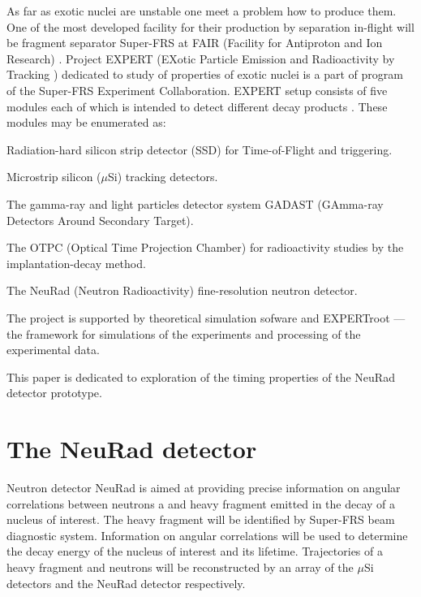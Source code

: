 \documentclass{webofc}
\begin{document}
As far as exotic nuclei are unstable one meet a problem how to produce them.
One of the most developed facility for their production by separation in-flight will be fragment separator Super-FRS at FAIR (Facility for Antiproton and Ion Research) \cite{diplom}. Project EXPERT (EXotic Particle Emission and Radioactivity by Tracking \cite{IMexpert}) dedicated to study of properties of exotic nuclei is a part of program of the Super-FRS Experiment Collaboration. EXPERT setup consists of five modules each of which is intended to detect different decay products \cite{tdr}.
These modules may be enumerated as:
\begin{inparaenum}[(i)]
	\item Radiation-hard silicon strip detector (SSD) for Time-of-Flight and triggering.
	\item Microstrip silicon ($\mu$Si) tracking detectors.
	\item The gamma-ray and light particles detector system GADAST (GAmma-ray Detectors Around Secondary Target).
	\item The OTPC (Optical Time Projection Chamber) for radioactivity studies by the implantation-decay method.
	\item The NeuRad (Neutron Radioactivity) fine-resolution neutron detector.
\end{inparaenum}

The project is supported by theoretical simulation sofware and EXPERTroot \cite{er} --- the framework for simulations of the experiments and processing of the experimental data. 

This paper is dedicated to exploration of the timing properties of the NeuRad detector prototype.

\section{The NeuRad detector}

Neutron detector NeuRad is aimed at providing precise information on angular correlations between neutrons a and heavy fragment emitted in the decay of a nucleus of interest. The heavy fragment will be identified by Super-FRS beam diagnostic system. Information on angular correlations will be used to determine the decay energy of the nucleus of interest and its lifetime. Trajectories of a heavy fragment and neutrons will be reconstructed by an array of the $\mu$Si detectors and the NeuRad detector respectively.
\end{document}
